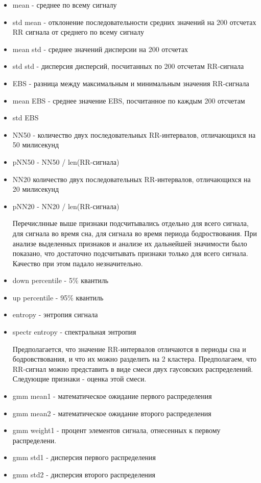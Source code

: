 \begin{itemize}
	\item mean - среднее по всему сигналу
	\item std mean - отклонение последовательности средних значений на 200 отсчетах RR сигнала от среднего по всему сигналу
	\item mean std - среднее значений дисперсии на 200 отсчетах
	\item std std - дисперсия дисперсий, посчитанных по 200 отсчетам RR-сигнала
	\item EBS - разница между максимальным и минимальным значения RR-сигнала
	\item mean EBS - среднее значение EBS, посчитанное по каждым 200 отсчетам
	\item std EBS
	\item NN50 - количество двух последовательных RR-интервалов, отличающихся на 50 милисекунд
	\item pNN50 - NN50 / len(RR-сигнала)
	\item NN20 количество двух последовательных RR-интервалов, отличающихся на 20 милисекунд
	\item pNN20 - NN20 / len(RR-сигнала)
	
	Перечислнные выше признаки подсчитывались отдельно для всего сигнала, для сигнала во время сна, для сигнала во время периода бодроствования. При анализе выделенных признаков и анализе их дальнейшей значимости было показано, что достаточно подсчитывать признаки только для всего сигнала. Качество при этом падало незначительно.
	
	\item down percentile - 5\% квантиль
	\item up percentile - 95\% квантиль
	\item entropy - энтропия сигнала
	\item spectr entropy - спектральная энтропия
	
	Предполагается, что значение RR-интервалов отличаются в периоды сна и бодровствования, и что их можно разделить на 2 кластера. Предполагаем, что RR-сигнал можно представить в виде смеси двух гаусовских распределений. Следующие признаки - оценка этой смеси. 
	
	\item gmm mean1 - математическое ожидание первого распределения
	\item gmm mean2 - математическое ожидание второго распределения
	\item gmm weight1 - процент элементов сигнала, отнесенных к первому распределени.
	\item gmm std1 - дисперсия первого распределения
	\item gmm std2 - дисперсия второго распределения
	

\end{itemize}
